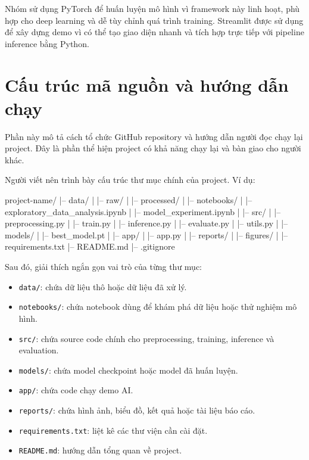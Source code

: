 \documentclass[12pt]{ai_conquer2026}
\begin{document}
\begin{aivncodebox}[Ví dụ:]
Nhóm sử dụng PyTorch để huấn luyện mô hình vì framework này linh hoạt, phù hợp cho deep learning và dễ tùy chỉnh quá trình training. Streamlit được sử dụng để xây dựng demo vì có thể tạo giao diện nhanh và tích hợp trực tiếp với pipeline inference bằng Python.
\end{aivncodebox}

\section{Cấu trúc mã nguồn và hướng dẫn chạy}

Phần này mô tả cách tổ chức GitHub repository và hướng dẫn người đọc chạy lại project. Đây là phần thể hiện project có khả năng chạy lại và bàn giao cho người khác.

Người viết nên trình bày cấu trúc thư mục chính của project. Ví dụ:

\newpage
\begin{aivnoutputbox}
project-name/
|-- data/
|   |-- raw/
|   |-- processed/
|
|-- notebooks/
|   |-- exploratory_data_analysis.ipynb
|   |-- model_experiment.ipynb
|
|-- src/
|   |-- preprocessing.py
|   |-- train.py
|   |-- inference.py
|   |-- evaluate.py
|   |-- utils.py
|
|-- models/
|   |-- best_model.pt
|
|-- app/
|   |-- app.py
|
|-- reports/
|   |-- figures/
|
|-- requirements.txt
|-- README.md
|-- .gitignore

\end{aivnoutputbox}

Sau đó, giải thích ngắn gọn vai trò của từng thư mục:

\begin{itemize}
\item \texttt{data/}: chứa dữ liệu thô hoặc dữ liệu đã xử lý.
\item \texttt{notebooks/}: chứa notebook dùng để khám phá dữ liệu hoặc thử nghiệm mô hình.
\item \texttt{src/}: chứa source code chính cho preprocessing, training, inference và evaluation.
\item \texttt{models/}: chứa model checkpoint hoặc model đã huấn luyện.
\item \texttt{app/}: chứa code chạy demo AI.
\item \texttt{reports/}: chứa hình ảnh, biểu đồ, kết quả hoặc tài liệu báo cáo.
\item \texttt{requirements.txt}: liệt kê các thư viện cần cài đặt.
\item \texttt{README.md}: hướng dẫn tổng quan về project.
\end{itemize}
\end{document}
